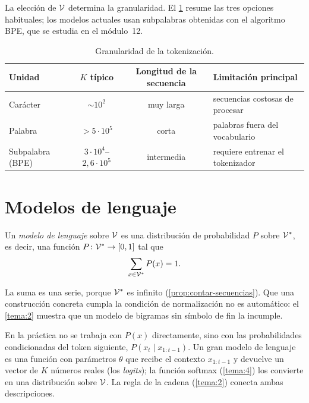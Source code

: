 \addtocounter{definicion}{1}%

La elección de $\mathcal{V}$ determina la granularidad. El \cref{tab:granularidad} resume las tres opciones habituales; los modelos actuales usan subpalabras obtenidas con el algoritmo BPE, que se estudia en el módulo~12.

\begin{table}[h]
\centering\small
\caption{Granularidad de la tokenización.}\label{tab:granularidad}
\begin{tabular}{@{}lccl@{}}
\toprule
Unidad & $K$ típico & Longitud de la secuencia & Limitación principal \\
\midrule
Carácter & $\sim 10^{2}$ & muy larga & secuencias costosas de procesar \\
Palabra & $>5\cdot 10^{5}$ & corta & palabras fuera del vocabulario \\
Subpalabra (BPE) & $3\cdot 10^{4}$–$2{,}6\cdot 10^{5}$ & intermedia & requiere entrenar el tokenizador \\
\bottomrule
\end{tabular}
\end{table}

\section{Modelos de lenguaje}

\begin{definicion}\label{def:ml}
Un \emph{modelo de lenguaje} sobre $\mathcal{V}$ es una distribución de probabilidad $P$ sobre $\mathcal{V}^{*}$, es decir, una función $P\colon\mathcal{V}^{*}\to[0,1]$ tal que
\[
\sum_{x\in\mathcal{V}^{*}}P(x)=1.
\]
\end{definicion}

La suma es una serie, porque $\mathcal{V}^{*}$ es infinito (\cref{prop:contar-secuencias}). Que una construcción concreta cumpla la condición de normalización no es automático: el \cref{tema:2} muestra que un modelo de bigramas sin símbolo de fin la incumple.

\begin{observacion}
En la práctica no se trabaja con $P(x)$ directamente, sino con las probabilidades condicionadas del token siguiente, $P(x_t\mid x_{1:t-1})$. Un gran modelo de lenguaje es una función con parámetros $\theta$ que recibe el contexto $x_{1:t-1}$ y devuelve un vector de $K$ números reales (los \emph{logits}); la función softmax (\cref{tema:4}) los convierte en una distribución sobre $\mathcal{V}$. La regla de la cadena (\cref{tema:2}) conecta ambas descripciones.
\end{observacion}

